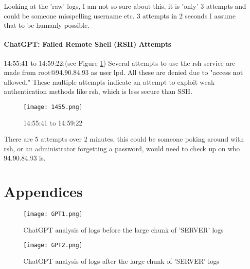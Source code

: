 \documentclass[
	letterpaper, %
	10pt, %
	unnumberedsections, %
	twoside, %
]{APAAssignment}
\begin{document}
Looking at the 'raw' logs, I am not so sure about this, it is 'only' 3 attempts and could be someone misspelling username etc. 3 attempts in 2 seconds I assume that to be humanly possible.

\subsubsection{ChatGPT: Failed Remote Shell (RSH) Attempts} 14:55:41 to 14:59:22:(see Figure \ref{fig:1455}) Several attempts to use the rsh service are made from root@94.90.84.93 as user lpd. All these are denied due to "access not allowed." These multiple attempts indicate an attempt to exploit weak authentication methods like rsh, which is less secure than SSH. \\

\begin{figure}[!htp] %
	\centering
	\texttt{[image: 1455.png]}
	\caption{14:55:41 to 14:59:22}	\label{fig:1455}
\end{figure}

There are 5 attempts over 2 minutes, this could be someone poking around with rsh, or an administrator forgetting a password, would need to check up on who 94.90.84.93 is.  



\clearpage
\printbibliography %





\appendix


\clearpage
\chapter{Appendices}
\begin{appendices}
\begin{figure}[!htp] %
	\centering
	\texttt{[image: GPT1.png]}
	\caption{ChatGPT analysis of logs before the large chunk of 'SERVER' logs}	\label{fig:GPT1.png}
\end{figure}
\begin{figure}[!htp] %
	\centering
	\texttt{[image: GPT2.png]}
	\caption{ChatGPT analysis of logs after the large chunk of 'SERVER' logs}	\label{fig:GPT2.png}
\end{figure}



\end{appendices}
\end{document}
